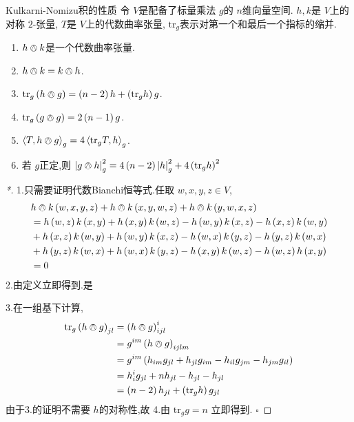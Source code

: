 \documentclass[../../几何与拓扑.tex]{subfiles}
\begin{document}
\begin{lemma}{Kulkarni-Nomizu积的性质}
    令 \(  V  \)是配备了标量乘法 \(  g  \)的 \(  n  \)维向量空间. \(  h,k  \)是 \(  V  \)上的对称 \(  2  \)-张量, \(  T  \)是 \(  V  \)上的代数曲率张量, \(  \mathrm{tr}_{g}  \)表示对第一个和最后一个指标的缩并.
    \begin{enumerate}
        \item  \(  h\owedge k  \)是一个代数曲率张量.
        \item \(  h\owedge k= k\owedge h  \).
        \item \(  \mathrm{tr}_{g}\left( h\owedge g \right)= \left( n-2 \right)h+ \left( \mathrm{tr}_{g}h \right)g     \).
        \item \(  \mathrm{tr}_{g}\left( g\owedge g \right)= 2\left( n-1 \right)g    \).
        \item \(  \left<T,h\owedge g \right>_{g}=  4\left<\mathrm{tr}_{g}T,h \right>_{g}  \).
        \item 若 \(  g  \)正定,则 \(  \left| g\owedge h \right|^{2}_{g}= 4\left( n-2 \right)\left| h \right|_{g}^{2}+ 4\left( \mathrm{tr}_{g}h \right)^{2}      \)       
    \end{enumerate}
             
\end{lemma}
\begin{proof}[*]

    
    1.只需要证明代数Bianchi恒等式.任取 \(  w,x,y,z \in V  \), \[
    \begin{aligned}
   & h\owedge k\left( w,x,y,z \right)+  h\owedge  k\left( x,y,w,z \right)+ h\owedge k \left( y,w,x,z \right)\\ 
     &=    h\left( w,z \right)k\left( x,y \right)+ h\left( x,y \right)k\left( w,z \right)- h\left( w,y \right)k\left( x,z\right)-h\left( x,z \right)k\left( w,y \right)          \\ 
      &+ h\left( x,z \right)k\left( w,y\right)+ h\left( w,y \right)   k\left( x,z \right)- h\left( w,x \right)k\left( y,z \right)-h\left( y,z \right)k\left( w,x \right)\\ 
       &+   h\left( y,z \right)k\left( w,x \right)+ h\left( w,x \right)k\left( y,z \right)-h\left( x,y \right)k\left( w,z \right)-h\left( w,z \right)h\left( x,y \right)   \\ 
        &= 0             
    \end{aligned}
    \] 
    2.由定义立即得到.是

    3.在一组基下计算, \[
    \begin{aligned}
    \mathrm{tr}_{g}\left( h\owedge g \right)_{jl}&=  \left( h\owedge g \right)_{i jl}^{i}    \\ 
     &= g^{im}\left( h\owedge g \right)_{ijlm}\\ 
      &=  g^{im}\left( h_{im}g_{jl}+ h_{jl}g_{im}-h_{il}g_{jm}-h_{jm}g_{il} \right)\\ 
       &= h_{i}^{i}g_{jl}+ nh_{jl}- h_{jl}-h_{jl}\\ 
        &= \left( n-2 \right)h_{jl}+ \left( \mathrm{tr}_{g}h \right)g_{jl}  
    \end{aligned}
    \]由于3.的证明不需要 \(  h  \)的对称性,故 4.由 \( \mathrm{tr}_{g}g =  n \)  立即得到.
    \hfill $\square$
\end{proof}
\end{document}
